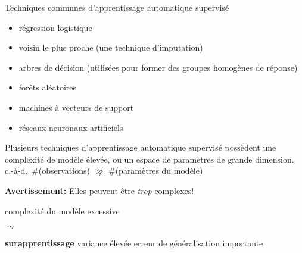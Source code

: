 

\begin{frame}{\vskip -0.35cm \large Techniques communes\vskip -0.05cm d'apprentissage automatique supervis\'e}

{\scriptsize
\begin{itemize}
\item
	r\'egression logistique
\item
	voisin le plus proche {\scriptsize (une technique d'imputation)}
\item
	arbres de d\'ecision {\scriptsize (utilis\'ees pour former des groupes homog\`enes de r\'eponse)}
\item
	for\^{e}ts al\'eatoires
\item
	machines \`a vecteurs de support
\item
	r\'eseaux neuronaux artificiels
\end{itemize}}

\large
\begin{center}
\pause
Plusieurs techniques d'apprentissage automatique supervis\'e poss\`edent
une complexit\'e de mod\`ele \'elev\'ee,
\pause ou un espace de param\`etres de grande dimension.
\pause
\vskip 0.05cm
{\normalsize c.-\`a-d.\, \#(observations) \;$\not\gg$\; \#(param\`etres du mod\`ele)}

\vskip 0.4cm
\pause
\textbf{Avertissement:} Elles peuvent \^{e}tre \textit{trop} complexes!

\pause
\vskip 0.4cm
\large
\begin{minipage}{4.0cm} \begin{center} complexit\'e du mod\`ele \vskip 0.01cm excessive \end{center} \end{minipage}
\;\;$\leadsto$\;\;
\begin{minipage}{4.5cm} \begin{center} \textbf{\Large\color{red}surapprentissage} \vskip 0.1cm {\scriptsize variance \'elev\'ee \vskip -0.175cm erreur de g\'en\'eralisation importante} \end{center} \end{minipage}
\end{center}

\end{frame}
\normalsize

